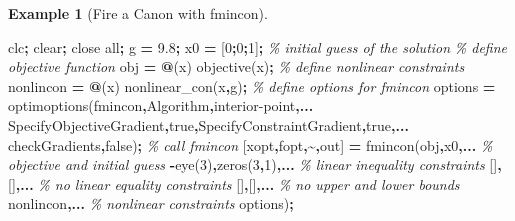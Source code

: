\documentclass[
]{book}
\newenvironment{Shaded}{\begin{snugshade}}{\end{snugshade}}
\newcommand{\CommentTok}[1]{\textcolor[rgb]{0.56,0.35,0.01}{\textit{#1}}}
\newcommand{\FloatTok}[1]{\textcolor[rgb]{0.00,0.00,0.81}{#1}}
\newcommand{\NormalTok}[1]{#1}
\newcommand{\OperatorTok}[1]{\textcolor[rgb]{0.81,0.36,0.00}{\textbf{#1}}}
\newcommand{\SpecialStringTok}[1]{\textcolor[rgb]{0.31,0.60,0.02}{#1}}
\newcommand{\VariableTok}[1]{\textcolor[rgb]{0.00,0.00,0.00}{#1}}
\theoremstyle{definition}
\theoremstyle{definition}
\newtheorem{example}{Example}[chapter]
\theoremstyle{definition}
\theoremstyle{definition}
\theoremstyle{remark}
\begin{document}
\begin{example}[Fire a Canon with fmincon]
\begin{Shaded}
\begin{Highlighting}[]
\VariableTok{clc}\OperatorTok{;} \VariableTok{clear}\OperatorTok{;} \VariableTok{close} \VariableTok{all}\OperatorTok{;}
\VariableTok{g} \OperatorTok{=} \FloatTok{9.8}\OperatorTok{;}
\VariableTok{x0} \OperatorTok{=}\NormalTok{ [}\FloatTok{0}\OperatorTok{;}\FloatTok{0}\OperatorTok{;}\FloatTok{1}\NormalTok{]}\OperatorTok{;} \CommentTok{\% initial guess of the solution}
\CommentTok{\% define objective function}
\VariableTok{obj} \OperatorTok{=} \OperatorTok{@}\NormalTok{(}\VariableTok{x}\NormalTok{) }\VariableTok{objective}\NormalTok{(}\VariableTok{x}\NormalTok{)}\OperatorTok{;}
\CommentTok{\% define nonlinear constraints}
\VariableTok{nonlincon} \OperatorTok{=} \OperatorTok{@}\NormalTok{(}\VariableTok{x}\NormalTok{) }\VariableTok{nonlinear\_con}\NormalTok{(}\VariableTok{x}\OperatorTok{,}\VariableTok{g}\NormalTok{)}\OperatorTok{;}
\CommentTok{\% define options for fmincon}
\VariableTok{options} \OperatorTok{=} \VariableTok{optimoptions}\NormalTok{(}\SpecialStringTok{\textquotesingle{}fmincon\textquotesingle{}}\OperatorTok{,}\SpecialStringTok{\textquotesingle{}Algorithm\textquotesingle{}}\OperatorTok{,}\SpecialStringTok{\textquotesingle{}interior{-}point\textquotesingle{}}\OperatorTok{,...}
    \SpecialStringTok{\textquotesingle{}SpecifyObjectiveGradient\textquotesingle{}}\OperatorTok{,}\VariableTok{true}\OperatorTok{,}\SpecialStringTok{\textquotesingle{}SpecifyConstraintGradient\textquotesingle{}}\OperatorTok{,}\VariableTok{true}\OperatorTok{,...}
    \SpecialStringTok{\textquotesingle{}checkGradients\textquotesingle{}}\OperatorTok{,}\VariableTok{false}\NormalTok{)}\OperatorTok{;}
\CommentTok{\% call fmincon}
\NormalTok{[}\VariableTok{xopt}\OperatorTok{,}\VariableTok{fopt}\OperatorTok{,\textasciitilde{},}\VariableTok{out}\NormalTok{] }\OperatorTok{=} \VariableTok{fmincon}\NormalTok{(}\VariableTok{obj}\OperatorTok{,}\VariableTok{x0}\OperatorTok{,...} \CommentTok{\% objective and initial guess}
    \OperatorTok{{-}}\VariableTok{eye}\NormalTok{(}\FloatTok{3}\NormalTok{)}\OperatorTok{,}\VariableTok{zeros}\NormalTok{(}\FloatTok{3}\OperatorTok{,}\FloatTok{1}\NormalTok{)}\OperatorTok{,...} \CommentTok{\% linear inequality constraints}
\NormalTok{    []}\OperatorTok{,}\NormalTok{[]}\OperatorTok{,...} \CommentTok{\% no linear equality constraints}
\NormalTok{    []}\OperatorTok{,}\NormalTok{[]}\OperatorTok{,...} \CommentTok{\% no upper and lower bounds}
    \VariableTok{nonlincon}\OperatorTok{,...} \CommentTok{\% nonlinear constraints}
    \VariableTok{options}\NormalTok{)}\OperatorTok{;}

\end{Highlighting}
\end{Shaded}
\end{example}
\end{document}
